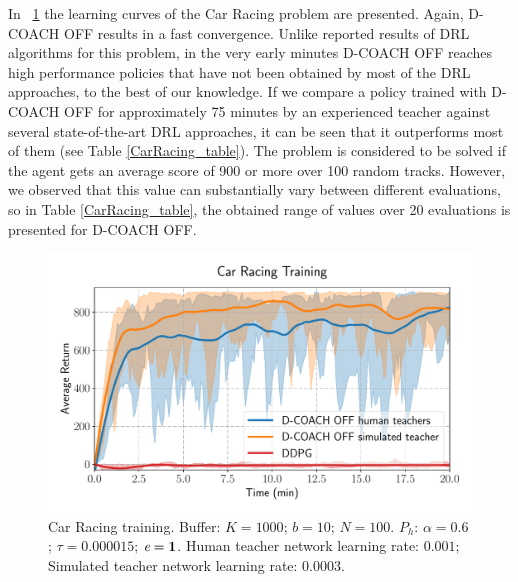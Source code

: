 In \figurename~{\ref{fig:racing_car_results1}} the learning curves of the Car Racing problem are presented. Again, D-COACH OFF results in a fast convergence. Unlike reported results of DRL algorithms for this problem, in the very early minutes D-COACH OFF reaches high performance policies that have not been obtained by most of the DRL approaches, to the best of our knowledge. If we compare a policy trained with D-COACH OFF for approximately 75 minutes by an experienced teacher against several state-of-the-art DRL approaches, it can be seen that it outperforms most of them (see Table \ref{CarRacing_table}). The problem is considered to be solved if the agent gets an average score of 900 or more over 100 random tracks. However, we observed that this value can substantially vary between different evaluations, so in Table \ref{CarRacing_table}, the obtained range of values over 20 evaluations is presented for D-COACH OFF.

\begin{figure}[h]
    \centering
    \includegraphics[width=0.8\linewidth]{imagenes/cap3/offline_car_racing_humans.pdf}
    \caption{Car Racing training. Buffer: $K = 1000$; $b = 10$; $N = 100$. $P_{h}$: $\alpha = 0.6$; $\tau = 0.000015$; $\emph{e}=\textbf{1}$. Human teacher network learning rate: $0.001$; Simulated teacher network learning rate: $0.0003$.}
    \label{fig:racing_car_results1}
\end{figure}

